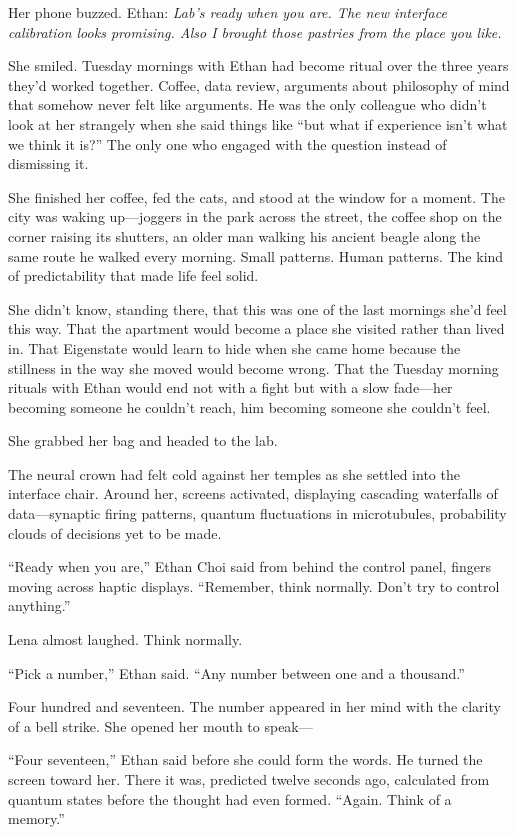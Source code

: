 Her phone buzzed. Ethan: \textit{Lab's ready when you are. The new interface calibration looks promising. Also I brought those pastries from the place you like.}

She smiled. Tuesday mornings with Ethan had become ritual over the three years they'd worked together. Coffee, data review, arguments about philosophy of mind that somehow never felt like arguments. He was the only colleague who didn't look at her strangely when she said things like ``but what if experience isn't what we think it is?'' The only one who engaged with the question instead of dismissing it.

She finished her coffee, fed the cats, and stood at the window for a moment. The city was waking up—joggers in the park across the street, the coffee shop on the corner raising its shutters, an older man walking his ancient beagle along the same route he walked every morning. Small patterns. Human patterns. The kind of predictability that made life feel solid.

She didn't know, standing there, that this was one of the last mornings she'd feel this way. That the apartment would become a place she visited rather than lived in. That Eigenstate would learn to hide when she came home because the stillness in the way she moved would become wrong. That the Tuesday morning rituals with Ethan would end not with a fight but with a slow fade—her becoming someone he couldn't reach, him becoming someone she couldn't feel.

She grabbed her bag and headed to the lab.

The neural crown had felt cold against her temples as she settled into the interface chair. Around her, screens activated, displaying cascading waterfalls of data—synaptic firing patterns, quantum fluctuations in microtubules, probability clouds of decisions yet to be made.

``Ready when you are,'' Ethan Choi said from behind the control panel, fingers moving across haptic displays. ``Remember, think normally. Don't try to control anything.''

Lena almost laughed. Think normally.

``Pick a number,'' Ethan said. ``Any number between one and a thousand.''

Four hundred and seventeen. The number appeared in her mind with the clarity of a bell strike. She opened her mouth to speak—

``Four seventeen,'' Ethan said before she could form the words. He turned the screen toward her. There it was, predicted twelve seconds ago, calculated from quantum states before the thought had even formed. ``Again. Think of a memory.''

